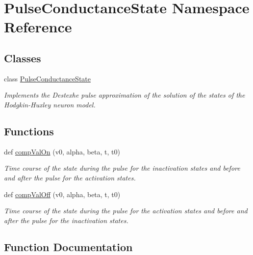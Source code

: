 \hypertarget{namespace_pulse_conductance_state}{}\section{Pulse\+Conductance\+State Namespace Reference}
\label{namespace_pulse_conductance_state}
\subsection*{Classes}
\begin{DoxyCompactItemize}
\item 
class \hyperlink{class_pulse_conductance_state_1_1_pulse_conductance_state}{Pulse\+Conductance\+State}
\begin{DoxyCompactList}\small\item\em Implements the Destexhe pulse approximation of the solution of the states of the Hodgkin-\/\+Huxley neuron model. \end{DoxyCompactList}\end{DoxyCompactItemize}
\subsection*{Functions}
\begin{DoxyCompactItemize}
\item 
def \hyperlink{namespace_pulse_conductance_state_acfdc241fcdde637f6df3a06e426c137d}{comp\+Val\+On} (v0, alpha, beta, t, t0)
\begin{DoxyCompactList}\small\item\em Time course of the state during the pulse for the {\itshape inactivation} states and before and after the pulse for the {\itshape activation} states. \end{DoxyCompactList}\item 
def \hyperlink{namespace_pulse_conductance_state_a9c75dc1dc214912259e3aaf30203fc1c}{comp\+Val\+Off} (v0, alpha, beta, t, t0)
\begin{DoxyCompactList}\small\item\em Time course of the state during the pulse for the {\itshape activation} states and before and after the pulse for the {\itshape inactivation} states. \end{DoxyCompactList}\end{DoxyCompactItemize}


\subsection{Function Documentation}

